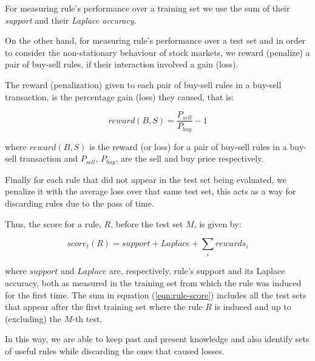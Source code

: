 \documentclass[preprint,3p,twocolumn]{elsarticle}
\begin{document}
For measuring rule's performance over a training set we use the sum of their \textit{support} and their \textit{Laplace accuracy}.

On the other hand, for measuring rule's performance over a test set and in order to consider the non-stationary behaviour of stock markets, we reward (penalize) a pair of buy-sell rules, if their interaction involved a gain (loss).

The reward (penalization) given to each pair of buy-sell rules in a buy-sell transaction, is the percentage gain (loss) they caused, that is:

\begin{equation} \label{eqn:reward}
reward(B,S) = \dfrac{P_{sell} }{P_{buy}} -1 
\end{equation}

where $reward(B,S)$ is the reward (or loss) for a pair of buy-sell rules in a buy-sell transaction and $P_{sell}$, $P_{buy}$, are the sell and buy price respectively.

Finally for each rule that did not appear in the test set being evaluated, we penalize it with the average loss over that same test set, this acts as a way for discarding rules due to the pass of time.

Thus, the score for a rule, $R$, before the test set $M$, is given by:

\begin{equation} \label{eqn:rule-score}
score_{t}(R) = support + Laplace + \sum_{i} rewards_{i}
\end{equation}

where $support$ and $Laplace$ are, respectively, rule's support and its Laplace accuracy, both as measured in the training set from which the rule was induced for the first time. The sum in equation (\ref{eqn:rule-score}) includes all the test sets that appear after the first training set where the rule $R$ is induced and up to (excluding) the $M$-th test.

In this way, we are able to keep past and present knowledge and also identify sets of useful rules while discarding the ones that caused losses.
\end{document}
